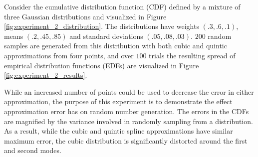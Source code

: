 


Consider the cumulative distribution function (CDF) defined by a mixture of three Gaussian distributions and visualized in Figure \ref{fig:experiment_2_distribution}. The distributions have weights $(.3, .6, .1)$, means $(.2, .45, .85)$ and standard deviations $(.05, .08, .03)$. $200$ random samples are generated from this distribution with both cubic and quintic approximations from four points, and over $100$ trials the resulting spread of empirical distribution functions (EDFs) are visualized in Figure \ref{fig:experiment_2_results}.

While an increased number of points could be used to decrease the error in either approximation, the purpose of this experiment is to demonstrate the effect approximation error has on random number generation. The errors in the CDFs are magnified by the variance involved in randomly sampling from a distribution. As a result, while the cubic and quintic spline approximations have similar maximum error, the cubic distribution is significantly distorted around the first and second modes.

